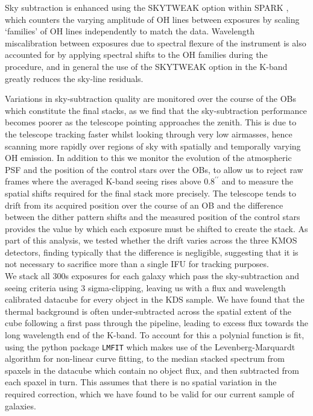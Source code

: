 \documentclass[fleqn,usenatbib]{mn2e}
\begin{document}
Sky subtraction is enhanced using the SKYTWEAK option within SPARK \citep{Davies2007}, which counters the varying amplitude of OH lines between exposures by scaling `families' of OH lines independently to match the data.
Wavelength miscalibration between exposures due to spectral flexure of the instrument is also accounted for by applying spectral shifts to the OH families during the procedure, and in general the use of the SKYTWEAK option in the K-band greatly reduces the sky-line residuals. 

Variations in sky-subtraction quality are monitored over the course of the OBs which constitute the final stacks, as we find that the sky-subtraction performance becomes poorer as the telescope pointing approaches the zenith.
This is due to the telescope tracking faster whilst looking through very low airmasses, hence scanning more rapidly over regions of sky with spatially and temporally varying OH emission.
In addition to this we monitor the evolution of the atmospheric PSF and the position of the control stars over the OBs, to allow us to reject raw frames where the averaged K-band seeing rises above $0.8^{\prime\prime}$ and to measure the spatial shifts required for the final stack more precisely.
The telescope tends to drift from its acquired position over the course of an OB and the difference between the dither pattern shifts and the measured position of the control stars provides the value by which each exposure must be shifted to create the stack. 
As part of this analysis, we tested whether the drift varies across the three KMOS detectors, finding typically that the difference is negligible, suggesting that it is not necessary to sacrifice more than a single IFU for tracking purposes. \\

We stack all 300s exposures for each galaxy which pass the sky-subtraction and seeing criteria using 3 sigma-clipping, leaving us with a flux and wavelength calibrated datacube for every object in the KDS sample.
We have found that the thermal background is often under-subtracted across the spatial extent of the cube following a first pass through the pipeline, leading to excess flux towards the long wavelength end of the K-band.
To account for this a polynial function is fit, using the python package {\tt LMFIT} \citep{Newville2014} which makes use of the Levenberg-Marquardt algorithm for non-linear curve fitting, to the median stacked spectrum from spaxels in the datacube which contain no object flux, and then subtracted from each spaxel in turn.
This assumes that there is no spatial variation in the required correction, which we have found to be valid for our current sample of galaxies. \\
\end{document}
